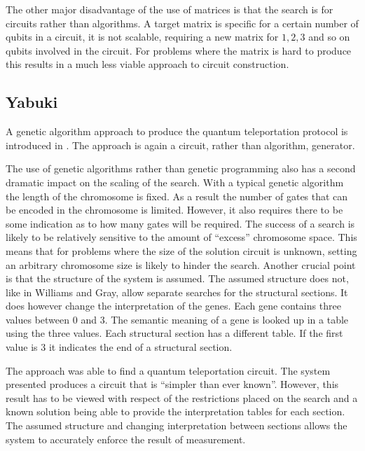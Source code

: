 The other major disadvantage of the use of matrices is that the search is for circuits rather than algorithms.
A target matrix is specific for a certain number of qubits in a circuit, it is not scalable, requiring a new matrix for $1, 2, 3$ and so on qubits involved in the circuit.
For problems where the matrix is hard to produce this results in a much less viable approach to circuit construction.

\subsection{Yabuki}
A genetic algorithm approach to produce the quantum teleportation protocol is introduced in \cite{Yabuki00geneticalgorithms}.
The approach is again a circuit, rather than algorithm, generator.

The use of genetic algorithms rather than genetic programming also has a second dramatic impact on the scaling of the search.
With a typical genetic algorithm the length of the chromosome is fixed.
As a result the number of gates that can be encoded in the chromosome is limited.
However, it also requires there to be some indication as to how many gates will be required.
The success of a search is likely to be relatively sensitive to the amount of ``excess'' chromosome space.
This means that for problems where the size of the solution circuit is unknown, setting an arbitrary chromosome size is likely to hinder the search.
Another crucial point is that the structure of the system is assumed.
The assumed structure does not, like in Williams and Gray\cite{Williams:1998:ADQ:645812.670824}, allow separate searches for the structural sections.
It does however change the interpretation of the genes.
Each gene contains three values between $0$ and $3$.
The semantic meaning of a gene is looked up in a table using the three values.
Each structural section has a different table.
If the first value is $3$ it indicates the end of a structural section.

The approach was able to find a quantum teleportation circuit.
The system presented produces a circuit that is ``simpler than ever known''\cite{Yabuki00geneticalgorithms}.
However, this result has to be viewed with respect of the restrictions placed on the search and a known solution being able to provide the interpretation tables for each section.
The assumed structure and changing interpretation between sections allows the system to accurately enforce the result of measurement.

